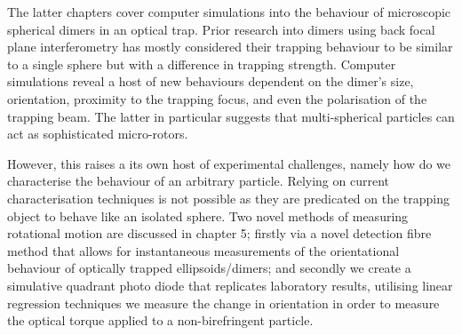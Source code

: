 The latter chapters cover computer simulations into the 
behaviour of microscopic spherical dimers in an optical
trap. Prior research into dimers using back focal plane
interferometry has mostly considered their trapping 
behaviour to be similar to a single sphere but with a 
difference in trapping strength. Computer simulations
reveal a host of new behaviours dependent on the dimer's
size, orientation, proximity to the trapping focus, and 
even the polarisation of the trapping beam. The latter in
particular suggests that multi-spherical particles can act
as sophisticated micro-rotors. 

However, this raises a its own host of experimental challenges,
namely how do we characterise the behaviour of an arbitrary
particle. Relying on current characterisation techniques is not
possible as they are predicated on the trapping object to behave
like an isolated sphere. Two novel methods of measuring rotational 
motion are discussed in chapter 5; firstly via a novel detection 
fibre method that allows for instantaneous measurements of the 
orientational behaviour of optically trapped ellipsoids/dimers; 
and secondly we create a simulative quadrant photo diode that 
replicates laboratory results, utilising linear regression 
techniques we measure the change in orientation in order to 
measure the optical torque applied to a non-birefringent particle. 
